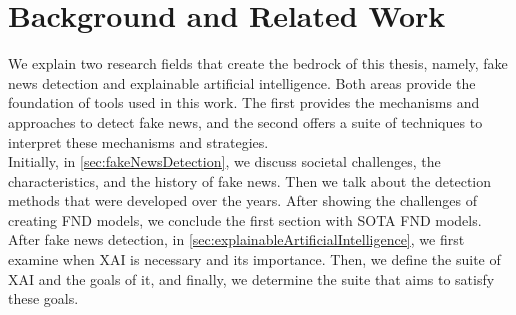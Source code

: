 
\chapter{Background and Related Work}\label{chapter:background}

We explain two research fields that create the bedrock of this thesis, namely, fake news detection and
explainable artificial intelligence. Both areas provide the foundation of tools used in this work. The first
provides the mechanisms and approaches to detect fake news, and the second offers a suite of techniques to interpret these mechanisms and strategies.\\
Initially, in \ref{sec:fakeNewsDetection}, we discuss societal challenges, the characteristics, and the history of fake news. Then we talk about the detection methods that were developed over the years. After showing the challenges of creating FND models, we conclude the first section with SOTA FND models.\\
After fake news detection, in \ref{sec:explainableArtificialIntelligence}, we first examine when XAI is necessary and its importance. Then, we define the suite of XAI and the goals of it, and finally, we determine the suite that aims to satisfy these goals.

